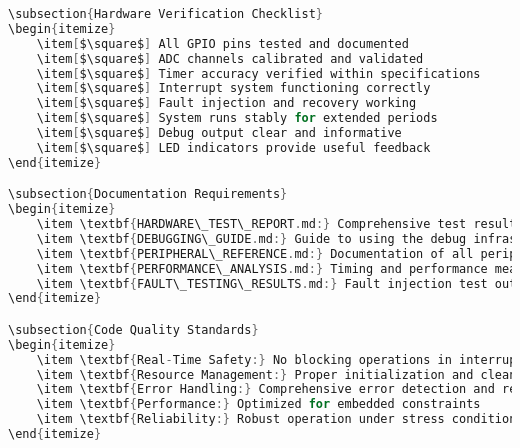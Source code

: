 \documentclass[11pt,a4paper]{article}
\begin{document}
\begin{lstlisting}[language=C]
\subsection{Hardware Verification Checklist}
\begin{itemize}
    \item[$\square$] All GPIO pins tested and documented
    \item[$\square$] ADC channels calibrated and validated
    \item[$\square$] Timer accuracy verified within specifications
    \item[$\square$] Interrupt system functioning correctly
    \item[$\square$] Fault injection and recovery working
    \item[$\square$] System runs stably for extended periods
    \item[$\square$] Debug output clear and informative
    \item[$\square$] LED indicators provide useful feedback
\end{itemize}

\subsection{Documentation Requirements}
\begin{itemize}
    \item \textbf{HARDWARE\_TEST\_REPORT.md:} Comprehensive test results and analysis
    \item \textbf{DEBUGGING\_GUIDE.md:} Guide to using the debug infrastructure
    \item \textbf{PERIPHERAL\_REFERENCE.md:} Documentation of all peripheral tests
    \item \textbf{PERFORMANCE\_ANALYSIS.md:} Timing and performance measurements
    \item \textbf{FAULT\_TESTING\_RESULTS.md:} Fault injection test outcomes
\end{itemize}

\subsection{Code Quality Standards}
\begin{itemize}
    \item \textbf{Real-Time Safety:} No blocking operations in interrupt handlers
    \item \textbf{Resource Management:} Proper initialization and cleanup
    \item \textbf{Error Handling:} Comprehensive error detection and recovery
    \item \textbf{Performance:} Optimized for embedded constraints
    \item \textbf{Reliability:} Robust operation under stress conditions
\end{itemize}


\end{lstlisting}
\end{document}
